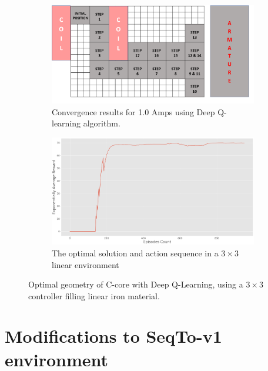 \begin{figure}[h!]
    \centering
        \begin{subfigure}{.45\textwidth}
        \includegraphics[width=\linewidth]{Figures/Ch_MDP/agent_result_TDlearning.png}
        \caption{Convergence results for 1.0 Amps using Deep Q-learning algorithm.}
        \label{subfig:RL_convergence_QL_1Amps}  
    \end{subfigure}
    \begin{subfigure}{.45\textwidth}
        \includegraphics[width=\textwidth]{Figures/Ch_RL/1_Amps_QL.png}
        \caption{The optimal solution and action sequence in a $3 \times 3$ linear environment}
        \label{subfig:RL_1A_DQL_results}
    \end{subfigure}
    \caption{Optimal geometry of C-core with Deep Q-Learning, using a $3 \times 3$ controller filling linear iron material.}
    \label{fig:DQN_results}
\end{figure}

\section{Modifications to SeqTo-v1 environment}
\label{section:RL_MDP}

